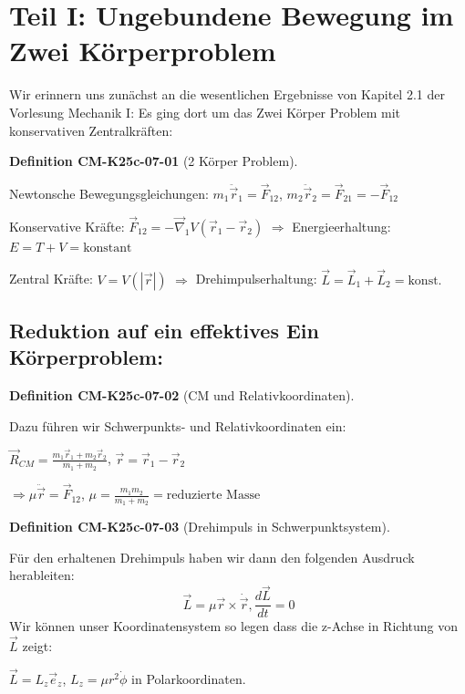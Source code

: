 \documentclass[10pt, letterpaper]{article}
\newcommand{\CustomHeading}[3]{%
  \par\medskip\noindent%
  \textbf{#1 #2} \textnormal{(#3)}.\enskip%
}
\newenvironment{DEF}[2]{\begin{unitbox}\CustomHeading{Definition}{#1}{#2}}{\end{unitbox}}
\begin{document}
\section{Teil I: Ungebundene Bewegung im Zwei Körperproblem}

Wir erinnern uns zunächst an die wesentlichen Ergebnisse von Kapitel 2.1 der Vorlesung Mechanik I: Es ging dort um das Zwei Körper Problem mit konservativen Zentralkräften:

\begin{DEF}{CM-K25c-07-01}{2 Körper Problem}
Newtonsche Bewegungsgleichungen: $m_1\ddot{\vec{r}}_1 = \vec{F}_{12}$, $m_2\ddot{\vec{r}}_2 = \vec{F}_{21} = -\vec{F}_{12}$

Konservative Kräfte: $\vec{F}_{12} = -\vec{\nabla}_1 V(\vec{r}_1-\vec{r}_2)$
$\Rightarrow$ Energieerhaltung: $E = T + V = \text{konstant}$

Zentral Kräfte: $V = V(|\vec{r}|)$
$\Rightarrow$ Drehimpulserhaltung: $\vec{L} = \vec{L}_1 + \vec{L}_2 = \text{konst.}$
\end{DEF}

\subsection{Reduktion auf ein effektives Ein Körperproblem:}

\begin{center}
\end{center}

\begin{DEF}{CM-K25c-07-02}{CM und Relativkoordinaten}
Dazu führen wir Schwerpunkts- und Relativkoordinaten ein:

$\vec{R}_{CM} = \frac{m_1\vec{r}_1 + m_2\vec{r}_2}{m_1+m_2}$, $\vec{r}=\vec{r}_1-\vec{r}_2$

$\Rightarrow \mu \ddot{\vec{r}} = \vec{F}_{12}$, $\mu = \frac{m_1m_2}{m_1+m_2} = \text{reduzierte Masse}$
\end{DEF}



\begin{DEF}{CM-K25c-07-03}{Drehimpuls in Schwerpunktsystem}
Für den erhaltenen Drehimpuls haben wir dann den folgenden
Ausdruck herableiten: 
$$\vec{L} = \mu \vec{r} \times \dot{\vec{r}}, \frac{d\vec{L}}{dt} = 0$$
Wir können unser Koordinatensystem so legen dass die z-Achse in Richtung von $\vec{L}$ zeigt:

$\vec{L} = L_z \vec{e}_z$, $L_z = \mu r^2\dot{\phi}$ in Polarkoordinaten.
\end{DEF}
\end{document}
